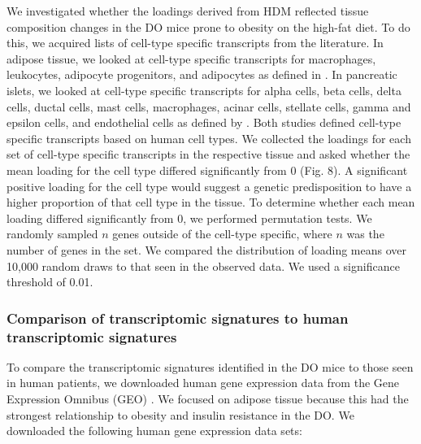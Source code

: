 \documentclass[
]{article}
\begin{document}
We investigated whether the loadings derived from HDM reflected tissue
composition changes in the DO mice prone to obesity on the high-fat
diet. To do this, we acquired lists of cell-type specific transcripts
from the literature. In adipose tissue, we looked at cell-type specific
transcripts for macrophages, leukocytes, adipocyte progenitors, and
adipocytes as defined in \cite{pmid29087381}. In pancreatic islets, we
looked at cell-type specific transcripts for alpha cells, beta cells,
delta cells, ductal cells, mast cells, macrophages, acinar cells,
stellate cells, gamma and epsilon cells, and endothelial cells as
defined by \cite{pmid36778506}. Both studies defined cell-type specific
transcripts based on human cell types. We collected the loadings for
each set of cell-type specific transcripts in the respective tissue and
asked whether the mean loading for the cell type differed significantly
from 0 (Fig. 8). A significant positive loading for the cell type would
suggest a genetic predisposition to have a higher proportion of that
cell type in the tissue. To determine whether each mean loading differed
significantly from 0, we performed permutation tests. We randomly
sampled \(n\) genes outside of the cell-type specific, where \(n\) was
the number of genes in the set. We compared the distribution of loading
means over 10,000 random draws to that seen in the observed data. We
used a significance threshold of 0.01.

\subsubsection{Comparison of transcriptomic signatures to human
transcriptomic
signatures}\label{comparison-of-transcriptomic-signatures-to-human-transcriptomic-signatures}

To compare the transcriptomic signatures identified in the DO mice to
those seen in human patients, we downloaded human gene expression data
from the Gene Expression Omnibus (GEO)
\cite{pmid37933855, pmid11752295}. We focused on adipose tissue because
this had the strongest relationship to obesity and insulin resistance in
the DO. We downloaded the following human gene expression data sets:
\end{document}
